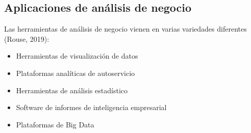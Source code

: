 \documentclass[twoside,twocolumn]{article}
\begin{document}
\subsection{Aplicaciones de análisis de negocio}
Las herramientas de análisis de negocio vienen en varias variedades diferentes (Rouse, 2019):
\begin{itemize}	

	\item Herramientas de visualización de datos
	\item Plataformas analíticas de autoservicio
	\item Herramientas de análisis estadístico
	\item Software de informes de inteligencia empresarial
	\item Plataformas de Big Data

\end{itemize} 



\end{document}
